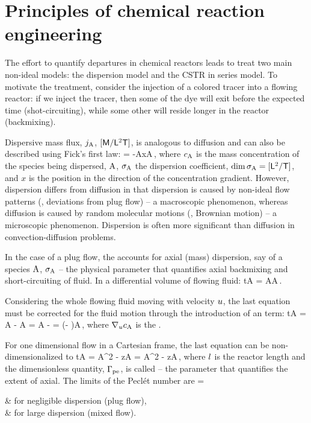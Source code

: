 \section{Principles of chemical reaction engineering}
The effort to quantify  departures in chemical reactors leads to treat two main non-ideal models: the dispersion model and the CSTR in series model. To motivate the treatment, consider the injection of a colored tracer into a flowing reactor: if we inject the tracer, then some of the dye will exit before the expected time (shot-circuiting), while some other will reside longer in the reactor (backmixing).

Dispersive mass flux, $\flux{\ce A}$, $[\mathsf{M}/\mathsf{L}^2\mathsf{T}]$, is analogous to diffusion and can also be described using Fick's first law:
\beq
{} = -\kdisp A\iod x\conc A\,,
\eeq
where $\conc A$ is the mass concentration of the species being dispersed, $\ce A$, $\kdisp A$ the dispersion coefficient, $\dim\kdisp A = [\phdim L^2/\phdim T]$, and $x$ is the position in the direction of the concentration gradient. However, dispersion differs from diffusion in that dispersion is caused by non-ideal flow patterns (\ie, deviations from plug flow) -- a macroscopic phenomenon, whereas diffusion is caused by random molecular motions (\ie, Brownian motion) -- a microscopic phenomenon. Dispersion is often more significant than diffusion in convection-diffusion problems.

In the case of a plug flow, the  accounts for axial (mass) dispersion, say of a species $\ce A$, $\kdisp A$ -- the physical parameter that quantifies axial backmixing and short-circuiting of fluid. In a differential volume of flowing fluid:
\beq
\ipd t\conc A = \kdisp A\lap\conc A\,.
\eeq

Considering the whole flowing fluid moving with velocity $u$, the last equation must be corrected for the fluid motion through the introduction of an  term:
\beq
\ipd t\conc A = \lap\conc A - \vel\iprod\grad\conc A
              = \lap\conc A - \dirder{}
              = \left(\lap - \dirder\vel{}\right)\conc A\,,
\eeq
where $\dirder\vel{\conc A}$ is the .

For one dimensional flow in a Cartesian frame, the last equation can be non-dimensionalized to
\beq
\ipd t\conc A = \conc A^2 - \igd z\conc A
              = \kpeclet{}\conc A^2 - \igd z\conc A\,,
\eeq
where $l$ is the reactor length and the dimensionless quantity, $\Gamma_\text{pe}$, is called  -- the parameter that quantifies the extent of axial. The limits of the Peclét number are
\beq
\kpeclet = 
    \begin{cases*}
             & for negligible dispersion (plug flow), \\
        \to\infty & for large dispersion (mixed flow).
    \end{cases*}
\eeq

